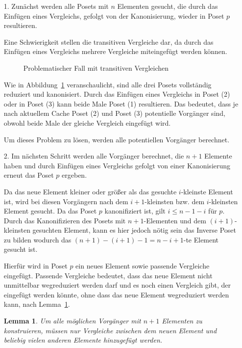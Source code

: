 \documentclass[10pt,journal,compsoc]{IEEEtran}
\newtheorem{lemma}{Lemma}
\begin{document}
\begin{itemize}
  \item[1.]
    Zunächst werden alle Posets mit $n$ Elementen gesucht, die durch das Einfügen eines Vergleichs, gefolgt von der Kanonisierung, wieder in Poset $p$ resultieren.

    Eine Schwierigkeit stellen die transitiven Vergleiche dar, da durch das Einfügen eines Vergleichs mehrere Vergleiche miteingefügt werden können.

    \begin{figure}
      \centering
      
      \caption{Problematischer Fall mit transitiven Vergleichen}
      \label{fig:backward_problematic}
    \end{figure}

    Wie in Abbildung~\ref{fig:backward_problematic} veranschaulicht, sind alle drei Posets vollständig reduziert und kanonisiert.
    Durch das Einfügen eines Vergleichs in Poset (2) oder in Poset (3) kann beide Male Poset (1) resultieren.
    Das bedeutet, dass je nach aktuellem Cache Poset (2) und Poset (3) potentielle Vorgänger sind, obwohl beide Male der gleiche Vergleich eingefügt wird.

    Um dieses Problem zu lösen, werden alle potentiellen Vorgänger berechnet.

  \item[2.]
    Im nächsten Schritt werden alle Vorgänger berechnet, die $n + 1$ Elemente haben und durch Einfügen eines Vergleichs gefolgt von einer Kanonisierung erneut das Poset $p$ ergeben.

    Da das neue Element kleiner oder größer als das gesuchte $i$-kleinste Element ist, wird bei diesen Vorgängern nach dem $i + 1$-kleinsten bzw. dem $i$-kleinsten Element gesucht.
    Da das Poset $p$ kanonifiziert ist, gilt $i \leq n - 1 - i$ für $p$.
    Durch das Kanonifizieren des Posets mit $n + 1$-Elementen und dem $(i + 1)$-kleinsten gesuchten Element, kann es hier jedoch nötig sein das Inverse Poset zu bilden wodurch das $(n + 1) - (i + 1) - 1 = n - i + 1$-te Element gesucht ist.

    Hierfür wird in Poset $p$ ein neues Element sowie passende Vergleiche eingefügt.
    Passende Vergleiche bedeutet, dass das neue Element nicht unmittelbar wegreduziert werden darf und es noch einen Vergleich gibt, der eingefügt werden könnte, ohne dass das neue Element wegreduziert werden kann, nach Lemma~\ref{lemma:remove_only_last_element_edge}.

    \begin{lemma} \label{lemma:remove_only_last_element_edge}
      Um alle möglichen Vorgänger mit $n + 1$ Elementen zu konstruieren, müssen nur Vergleiche zwischen dem neuen Element und beliebig vielen anderen Elemente hinzugefügt werden.
    \end{lemma}


\end{itemize}
\end{document}
